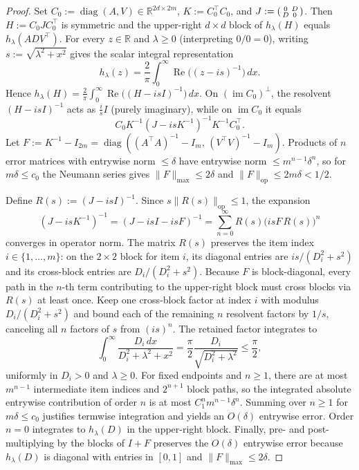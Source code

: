 \documentclass[11pt]{article}
\theoremstyle{plain}
\theoremstyle{definition}
\theoremstyle{remark}
\DeclareMathOperator{\diag}{diag}
\begin{document}
\begin{proof}
Set $C_0 := \diag(A, V) \in \mathbb{R}^{2d \times 2m}$, $K := C_0^\top C_0$, and $J := \begin{psmallmatrix} 0 & D \\ D & 0 \end{psmallmatrix}$.
Then $H := C_0 J C_0^\top$ is symmetric and the upper-right $d \times d$ block of $h_\lambda(H)$ equals $h_\lambda(ADV^\top)$.
For every $z \in \mathbb{R}$ and $\lambda \ge 0$ (interpreting $0/0 = 0$), writing $s := \sqrt{\lambda^2 + x^2}$ gives the scalar integral representation
\[
h_\lambda(z) = \frac{2}{\pi} \int_0^\infty \operatorname{Re}\bigl((z - is)^{-1}\bigr)\,dx.
\]
Hence $h_\lambda(H) = \frac{2}{\pi}\int_0^\infty \operatorname{Re}\bigl((H - isI)^{-1}\bigr)\,dx$.
On $(\operatorname{im} C_0)^\perp$, the resolvent $(H - isI)^{-1}$ acts as $\frac{i}{s}I$ (purely imaginary), while on $\operatorname{im} C_0$ it equals
\[
C_0 K^{-1}(J - is K^{-1})^{-1} K^{-1} C_0^\top.
\]
Let $F := K^{-1} - I_{2m} = \diag((A^\top A)^{-1} - I_m,\, (V^\top V)^{-1} - I_m)$.
Products of $n$ error matrices with entrywise norm $\le \delta$ have entrywise norm $\le m^{n-1}\delta^n$, so for $m\delta \le c_0$ the Neumann series gives $\|F\|_{\max} \le 2\delta$ and $\|F\|_{\mathrm{op}} \le 2m\delta < 1/2$.

Define $R(s) := (J - isI)^{-1}$. Since $s\|R(s)\|_{\mathrm{op}} \le 1$, the expansion
\[
(J - is K^{-1})^{-1} = (J - isI - isF)^{-1} = \sum_{n=0}^\infty R(s)\bigl(isF\,R(s)\bigr)^n
\]
converges in operator norm.
The matrix $R(s)$ preserves the item index $i \in \{1,\dots,m\}$: on the $2 \times 2$ block for item $i$, its diagonal entries are $is/(D_i^2+s^2)$ and its cross-block entries are $D_i/(D_i^2+s^2)$.
Because $F$ is block-diagonal, every path in the $n$-th term contributing to the upper-right block must cross blocks via $R(s)$ at least once.
Keep one cross-block factor at index $i$ with modulus $D_i/(D_i^2+s^2)$ and bound each of the remaining $n$ resolvent factors by $1/s$, canceling all $n$ factors of $s$ from $(is)^n$.
The retained factor integrates to
\[
\int_0^\infty \frac{D_i\,dx}{D_i^2 + \lambda^2 + x^2} = \frac{\pi}{2}\frac{D_i}{\sqrt{D_i^2 + \lambda^2}} \le \frac{\pi}{2},
\]
uniformly in $D_i > 0$ and $\lambda \ge 0$.
For fixed endpoints and $n \ge 1$, there are at most $m^{n-1}$ intermediate item indices and $2^{n+1}$ block paths, so the integrated absolute entrywise contribution of order $n$ is at most $C_1^n m^{n-1}\delta^n$.
Summing over $n \ge 1$ for $m\delta \le c_0$ justifies termwise integration and yields an $O(\delta)$ entrywise error.
Order $n = 0$ integrates to $h_\lambda(D)$ in the upper-right block.
Finally, pre- and post-multiplying by the blocks of $I + F$ preserves the $O(\delta)$ entrywise error because $h_\lambda(D)$ is diagonal with entries in $[0,1]$ and $\|F\|_{\max} \le 2\delta$.
\end{proof}
\end{document}
